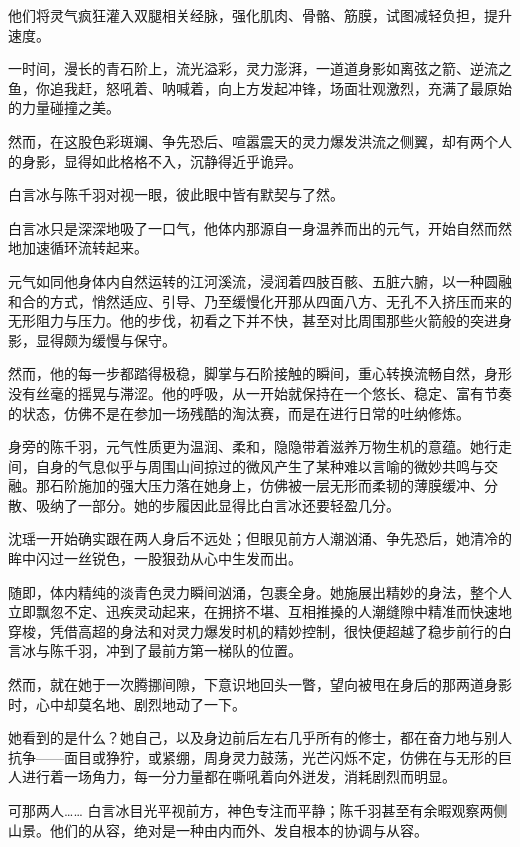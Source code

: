 他们将灵气疯狂灌入双腿相关经脉，强化肌肉、骨骼、筋膜，试图减轻负担，提升速度。

一时间，漫长的青石阶上，流光溢彩，灵力澎湃，一道道身影如离弦之箭、逆流之鱼，你追我赶，怒吼着、呐喊着，向上方发起冲锋，场面壮观激烈，充满了最原始的力量碰撞之美。

\vspace{2em}

然而，在这股色彩斑斓、争先恐后、喧嚣震天的灵力爆发洪流之侧翼，却有两个人的身影，显得如此格格不入，沉静得近乎诡异。

白言冰与陈千羽对视一眼，彼此眼中皆有默契与了然。

白言冰只是深深地吸了一口气，他体内那源自一身温养而出的元气，开始自然而然地加速循环流转起来。

元气如同他身体内自然运转的江河溪流，浸润着四肢百骸、五脏六腑，以一种圆融和合的方式，悄然适应、引导、乃至缓慢化开那从四面八方、无孔不入挤压而来的无形阻力与压力。他的步伐，初看之下并不快，甚至对比周围那些火箭般的突进身影，显得颇为缓慢与保守。

然而，他的每一步都踏得极稳，脚掌与石阶接触的瞬间，重心转换流畅自然，身形没有丝毫的摇晃与滞涩。他的呼吸，从一开始就保持在一个悠长、稳定、富有节奏的状态，仿佛不是在参加一场残酷的淘汰赛，而是在进行日常的吐纳修炼。

身旁的陈千羽，元气性质更为温润、柔和，隐隐带着滋养万物生机的意蕴。她行走间，自身的气息似乎与周围山间掠过的微风产生了某种难以言喻的微妙共鸣与交融。那石阶施加的强大压力落在她身上，仿佛被一层无形而柔韧的薄膜缓冲、分散、吸纳了一部分。她的步履因此显得比白言冰还要轻盈几分。

\vspace{2em}

沈瑶一开始确实跟在两人身后不远处；但眼见前方人潮汹涌、争先恐后，她清冷的眸中闪过一丝锐色，一股狠劲从心中生发而出。

随即，体内精纯的淡青色灵力瞬间汹涌，包裹全身。她施展出精妙的身法，整个人立即飘忽不定、迅疾灵动起来，在拥挤不堪、互相推搡的人潮缝隙中精准而快速地穿梭，凭借高超的身法和对灵力爆发时机的精妙控制，很快便超越了稳步前行的白言冰与陈千羽，冲到了最前方第一梯队的位置。

然而，就在她于一次腾挪间隙，下意识地回头一瞥，望向被甩在身后的那两道身影时，心中却莫名地、剧烈地动了一下。

她看到的是什么？她自己，以及身边前后左右几乎所有的修士，都在奋力地与别人抗争——面目或狰狞，或紧绷，周身灵力鼓荡，光芒闪烁不定，仿佛在与无形的巨人进行着一场角力，每一分力量都在嘶吼着向外迸发，消耗剧烈而明显。

可那两人…… 白言冰目光平视前方，神色专注而平静；陈千羽甚至有余暇观察两侧山景。他们的从容，绝对是一种由内而外、发自根本的协调与从容。

